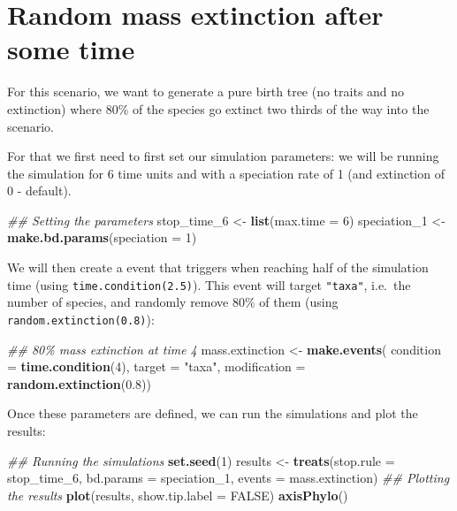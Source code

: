 \documentclass[
]{book}
\newenvironment{Shaded}{\begin{snugshade}}{\end{snugshade}}
\newcommand{\CommentTok}[1]{\textcolor[rgb]{0.56,0.35,0.01}{\textit{#1}}}
\newcommand{\DataTypeTok}[1]{\textcolor[rgb]{0.13,0.29,0.53}{#1}}
\newcommand{\DecValTok}[1]{\textcolor[rgb]{0.00,0.00,0.81}{#1}}
\newcommand{\FloatTok}[1]{\textcolor[rgb]{0.00,0.00,0.81}{#1}}
\newcommand{\KeywordTok}[1]{\textcolor[rgb]{0.13,0.29,0.53}{\textbf{#1}}}
\newcommand{\NormalTok}[1]{#1}
\newcommand{\OtherTok}[1]{\textcolor[rgb]{0.56,0.35,0.01}{#1}}
\newcommand{\StringTok}[1]{\textcolor[rgb]{0.31,0.60,0.02}{#1}}
\begin{document}
\hypertarget{EGrandom_ext}{%
\section{Random mass extinction after some time}\label{EGrandom_ext}}

For this scenario, we want to generate a pure birth tree (no traits and no extinction) where 80\% of the species go extinct two thirds of the way into the scenario.

For that we first need to first set our simulation parameters: we will be running the simulation for 6 time units and with a speciation rate of 1 (and extinction of 0 - default).

\begin{Shaded}
\begin{Highlighting}[]
\CommentTok{\#\# Setting the parameters}
\NormalTok{stop\_time\_}\DecValTok{6}\NormalTok{ \textless{}{-}}\StringTok{ }\KeywordTok{list}\NormalTok{(}\DataTypeTok{max.time =} \DecValTok{6}\NormalTok{)}
\NormalTok{speciation\_}\DecValTok{1}\NormalTok{ \textless{}{-}}\StringTok{ }\KeywordTok{make.bd.params}\NormalTok{(}\DataTypeTok{speciation =} \DecValTok{1}\NormalTok{)}
\end{Highlighting}
\end{Shaded}

We will then create a event that triggers when reaching half of the simulation time (using \texttt{time.condition(2.5)}).
This event will target \texttt{"taxa"}, i.e.~the number of species, and randomly remove 80\% of them (using \texttt{random.extinction(0.8)}):

\begin{Shaded}
\begin{Highlighting}[]
\CommentTok{\#\# 80\% mass extinction at time 4}
\NormalTok{mass.extinction \textless{}{-}}\StringTok{ }\KeywordTok{make.events}\NormalTok{(}
                    \DataTypeTok{condition =} \KeywordTok{time.condition}\NormalTok{(}\DecValTok{4}\NormalTok{),}
                    \DataTypeTok{target =} \StringTok{"taxa"}\NormalTok{,}
                    \DataTypeTok{modification =} \KeywordTok{random.extinction}\NormalTok{(}\FloatTok{0.8}\NormalTok{))}
\end{Highlighting}
\end{Shaded}

Once these parameters are defined, we can run the simulations and plot the results:

\begin{Shaded}
\begin{Highlighting}[]
\CommentTok{\#\# Running the simulations}
\KeywordTok{set.seed}\NormalTok{(}\DecValTok{1}\NormalTok{)}
\NormalTok{results \textless{}{-}}\StringTok{ }\KeywordTok{treats}\NormalTok{(}\DataTypeTok{stop.rule =}\NormalTok{ stop\_time\_}\DecValTok{6}\NormalTok{,}
                \DataTypeTok{bd.params =}\NormalTok{ speciation\_}\DecValTok{1}\NormalTok{,}
                \DataTypeTok{events    =}\NormalTok{ mass.extinction)}
\CommentTok{\#\# Plotting the results}
\KeywordTok{plot}\NormalTok{(results, }\DataTypeTok{show.tip.label =} \OtherTok{FALSE}\NormalTok{)}
\KeywordTok{axisPhylo}\NormalTok{()}
\end{Highlighting}
\end{Shaded}
\end{document}
